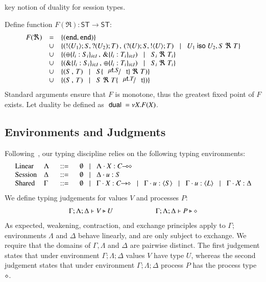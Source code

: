 key notion of duality for session types.
%
\begin{definition}[Duality]\rm
	Define function $F(\Re): \mathsf{ST} \longrightarrow \mathsf{ST}$:
	\[
		\begin{array}{rcl}
			F(\Re) 	&=&	\set{(\tinact, \tinact)}\\
				&\cup&	\set{(\btout{U_1} S, \btinp{U_2} T)\,,\, (\btinp{U} S, \btout{U} T) \bnfbar U_1 \iso U_2, S\ \Re\ T}\\
				&\cup&	\set{(\btsel{l_i: S_i}_{i \in I} \,,\, \btbra{l_i: T_i}_{i \in I}) \bnfbar  S_i\ \Re\ T_i}\\
				&\cup&	\set{(\btbra{l_i: S_i}_{i \in I}\,,\, \btsel{l_i: T_i}_{i \in I}) \bnfbar S_i\ \Re\ T_i}\\
				&\cup&	\set{(S\,,\, T) \bnfbar S\subst{\trec{t}{S}}{\vart{t}}\ \Re\ T)}\\
				&\cup&	\set{(S\,,\, T) \bnfbar S\ \Re\ T\subst{\trec{t}{T}}{\vart{t}})}
		\end{array}
	\]	
	\noi Standard arguments ensure that $F$ is monotone, thus the greatest fixed point
	of $F$ exists. Let duality be defined as $\ \mathsf{dual}\  = \nu X. F(X)$.
\end{definition}
%



\subsection{Environments and Judgments}
%
Following~\cite{tlca07}, 
our typing discipline relies on the following typing environments: %
\[
\begin{array}{llcl}
	\text{Linear}	& \Lambda & \bnfis &	\emptyset \bnfbar \Lambda \cat \varp{X}: \lhot{C}\\
	\text{Session}	& \Delta  & \bnfis &	\emptyset \bnfbar \Delta \cat u:S \\
	\text{Shared}	& \Gamma  & \bnfis &	\emptyset \bnfbar \Gamma \cat \varp{X}: \shot{C} \bnfbar \Gamma \cat u: \chtype{S} \bnfbar
						\Gamma \cat u: \chtype{L} \bnfbar \Gamma \cat \rvar{X}: \Delta
\end{array}
\]
%
\noi We define typing judgements for values $V$
and processes $P$:
%
\[	\begin{array}{c}
		\Gamma; \Lambda; \Delta \vdash V \triangleright U \qquad \qquad \qquad \Gamma; \Lambda; \Delta \vdash P \triangleright \diamond
	\end{array}
\]
%
\noi As expected, weakening, contraction, and exchange principles apply to $\Gamma$;
environments $\Lambda$ and $\Delta$ behave linearly, and are only subject to exchange.
We require that the domains of $\Gamma, \Lambda$ and $\Delta$ are pairwise distinct.
The first judgement states that under environment $\Gamma; \Lambda; \Delta$
values $V$ have type $U$,
whereas the second judgement states that under environment $\Gamma; \Lambda; \Delta$
process $P$ has the process type $\diamond$.

